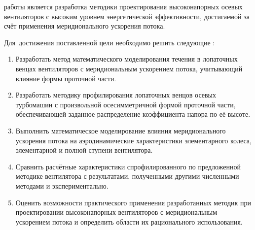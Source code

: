 {\aim} работы является разработка методики проектирования высоконапорных осевых вентиляторов с высоким уровнем энергетической эффективности, достигаемой за счёт применения меридионального ускорения потока.

Для~достижения поставленной цели необходимо решить следующие {\tasks}:
\begin{enumerate}[beginpenalty=10000] %
	\item Разработать метод математического моделирования течения в лопаточных венцах вентиляторов с меридиональным ускорением потока, учитывающий влияние формы проточной части.

	\item Разработать методику профилирования лопаточных венцов осевых турбомашин с произвольной осесимметричной формой проточной части, обеспечивающей заданное распределение коэффициента напора по её высоте.

	\item Выполнить математическое моделирование влияния меридионального ускорения потока на аэродинамические характеристики элементарного колеса, элементарной и полной ступени вентилятора.

	\item Сравнить расчётные характеристики спрофилированного по предложенной методике вентилятора с результатами, полученными другими численными методами и экспериментально.

	\item Оценить возможности практического применения разработанных методик при проектировании высоконапорных вентиляторов с меридиональным ускорением потока и определить области их рационального использования.

\end{enumerate}

